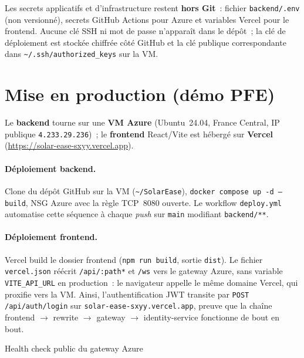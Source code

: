 Les secrets applicatifs et d'infrastructure restent \textbf{hors Git}~:
fichier \texttt{backend/.env} (non versionné), secrets GitHub Actions pour
Azure et variables Vercel pour le frontend. Aucune clé SSH ni mot de passe
n'apparaît dans le dépôt~; la clé de déploiement est stockée chiffrée côté
GitHub et la clé publique correspondante dans
\texttt{\textasciitilde/.ssh/authorized\_keys} sur la VM.

\section{Mise en production (démo PFE)}
\label{sec:prod-pfe}

Le \textbf{backend} tourne sur une \textbf{VM Azure} (Ubuntu~24.04,
France Central, IP publique \texttt{4.233.29.236})~; le \textbf{frontend}
React/Vite est hébergé sur \textbf{Vercel}
(\url{https://solar-ease-sxyy.vercel.app}).

\paragraph{Déploiement backend.}
Clone du dépôt GitHub sur la VM (\texttt{\textasciitilde/SolarEase}),
\texttt{docker compose up -d --build}, NSG Azure avec la règle TCP~8080
ouverte. Le workflow \texttt{deploy.yml} automatise cette séquence à chaque
\textit{push} sur \texttt{main} modifiant \texttt{backend/**}.

\paragraph{Déploiement frontend.}
Vercel build le dossier frontend (\texttt{npm run build}, sortie \texttt{dist}).
Le fichier \texttt{vercel.json} réécrit \texttt{/api/:path*} et \texttt{/ws}
vers le gateway Azure, sans variable \texttt{VITE\_API\_URL} en production~:
le navigateur appelle le même domaine Vercel, qui proxifie vers la VM. Ainsi,
l'authentification JWT transite par \texttt{POST /api/auth/login} sur
\texttt{solar-ease-sxyy.vercel.app}, preuve que la chaîne frontend $\rightarrow$
rewrite $\rightarrow$ gateway $\rightarrow$ identity-service fonctionne de bout
en bout.

{Health check public du gateway Azure}


